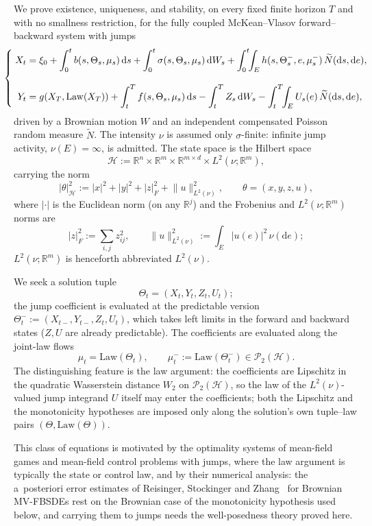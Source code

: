 \documentclass[preprint,12pt]{elsarticle}
\newcommand{\R}{\mathbb{R}}
\newcommand{\diff}{\mathrm{d}}
\newcommand{\Nt}{\widetilde{N}}
\newcommand{\Lnu}{L^2(\nu)}
\newcommand{\Law}{\mathrm{Law}}
\newcommand{\Lnorm}[1]{\lVert #1\rVert_{\Lnu}}
\providecommand{\PaperSystemBox}[1]{\mathmakebox[0.9\linewidth][c]{#1}}
\numberwithin{equation}{section}
\theoremstyle{plain}
\theoremstyle{definition}
\theoremstyle{\PaperRemarkStyle}
\begin{document}
We prove existence, uniqueness, and stability, on every fixed finite horizon $T$ and
with no smallness restriction, for the fully coupled
McKean--Vlasov forward--backward system with jumps
\begin{equation}\label{eq:mvfbsdej}
\PaperSystemBox{\left\{\;\begin{aligned}
X_t&=\xi_0+\int_0^t b(s,\Theta_s,\mu_s)\,\diff s+\int_0^t\sigma(s,\Theta_s,\mu_s)\,\diff W_s
  +\int_0^t\!\!\int_E h(s,\Theta_{s}^-,e,\mu_s^-)\,\Nt(\diff s,\diff e),\\[9pt]
Y_t&=g(X_T,\Law(X_T))+\int_t^T f(s,\Theta_s,\mu_s)\,\diff s
  -\int_t^T Z_s\,\diff W_s-\int_t^T\!\!\int_E U_s(e)\,\Nt(\diff s,\diff e),
\end{aligned}\right.}
\end{equation}
driven by a Brownian motion $W$ and an independent compensated Poisson random measure
$\Nt$. The intensity $\nu$ is assumed only $\sigma$-finite: infinite jump
activity, $\nu(E)=\infty$, is admitted. The state space is the
Hilbert space
\[
\mathcal H:=\R^n\times\R^m\times\R^{m\times d}\times L^2(\nu;\R^m),
\]
carrying the norm
\[
|\theta|_{\mathcal H}^2:=|x|^2+|y|^2+|z|_F^2+\Lnorm{u}^2,\qquad \theta=(x,y,z,u),
\]
where $|\cdot|$ is the Euclidean norm (on any $\R^j$) and the Frobenius and
$L^2(\nu;\R^m)$ norms are
\[
|z|_F^2:=\sum_{i,j}z_{ij}^2,
\qquad
\Lnorm{u}^2:=\int_E|u(e)|^2\,\nu(\diff e);
\]
$L^2(\nu;\R^m)$ is henceforth abbreviated $\Lnu$.

We seek a solution tuple
\[
\Theta_t=(X_t,Y_t,Z_t,U_t);
\]
the jump coefficient is evaluated at the predictable version
$\Theta_t^-:=(X_{t-},Y_{t-},Z_t,U_t)$, which takes left limits in the forward and backward
states ($Z,U$ are already predictable). The coefficients are evaluated along the joint-law flows
\[
\mu_t=\Law(\Theta_t),\qquad \mu_t^-:=\Law(\Theta_t^-)\in\mathcal P_2(\mathcal H).
\]
The distinguishing feature is the law argument:
the coefficients are Lipschitz in the quadratic Wasserstein distance $W_2$
on $\mathcal P_2(\mathcal H)$, so the law of the $\Lnu$-valued jump integrand $U$ itself
may enter the coefficients; both the Lipschitz and the monotonicity hypotheses are
imposed only along the solution's own tuple--law pairs $(\Theta,\Law(\Theta))$.

This class
of equations is motivated by the optimality systems of mean-field games and mean-field
control problems with jumps, where the law argument is typically the state or control law,
and by their numerical analysis: the a~posteriori error estimates of Reisinger, Stockinger
and Zhang~\cite{RSZ} for Brownian MV-FBSDEs rest on the Brownian case of the monotonicity
hypothesis used below, and carrying them to jumps needs the well-posedness theory proved
here.
\end{document}

